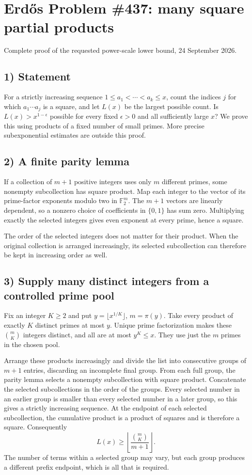 \section{Erd\H{o}s Problem \#437: many square partial products}
\noindent Complete proof of the requested power-scale lower bound, 24 September 2026.

\subsection*{1) Statement}
For a strictly increasing sequence $1\le a_1<\cdots<a_k\le x$, count the indices $j$ for which $a_1\cdots a_j$ is a square, and let $L(x)$ be the largest possible count. Is $L(x)>x^{1-\epsilon}$ possible for every fixed $\epsilon>0$ and all sufficiently large $x$? We prove this using products of a fixed number of small primes. More precise subexponential estimates are outside this proof.

\subsection*{2) A finite parity lemma}
If a collection of $m+1$ positive integers uses only $m$ different primes, some nonempty subcollection has square product. Map each integer to the vector of its prime-factor exponents modulo two in $\mathbb F_2^m$. The $m+1$ vectors are linearly dependent, so a nonzero choice of coefficients in $\{0,1\}$ has sum zero. Multiplying exactly the selected integers gives even exponent at every prime, hence a square.

The order of the selected integers does not matter for their product. When the original collection is arranged increasingly, its selected subcollection can therefore be kept in increasing order as well.

\subsection*{3) Supply many distinct integers from a controlled prime pool}
Fix an integer $K\ge2$ and put $y=\lfloor x^{1/K}\rfloor$, $m=\pi(y)$. Take every product of exactly $K$ distinct primes at most $y$. Unique prime factorization makes these $\binom mK$ integers distinct, and all are at most $y^K\le x$. They use just the $m$ primes in the chosen pool.

Arrange these products increasingly and divide the list into consecutive groups of $m+1$ entries, discarding an incomplete final group. From each full group, the parity lemma selects a nonempty subcollection with square product. Concatenate the selected subcollections in the order of the groups. Every selected number in an earlier group is smaller than every selected number in a later group, so this gives a strictly increasing sequence. At the endpoint of each selected subcollection, the cumulative product is a product of squares and is therefore a square. Consequently
\[L(x)\ge\left\lfloor\frac{\binom mK}{m+1}\right\rfloor.\tag{1}\]
The number of terms within a selected group may vary, but each group produces a different prefix endpoint, which is all that is required.

